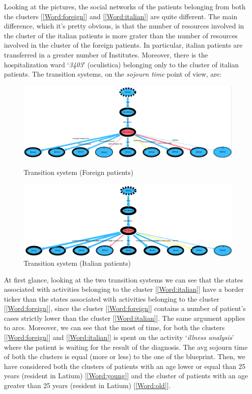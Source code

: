 \newline
\noindent
Looking at the pictures, the social networks of the patients belonging from both the clusters [\ref{Word:foreign}] and [\ref{Word:italian}] are quite different. The main difference, which it’s pretty obvious, is that the number of resources involved in the cluster of the italian patients is more grater than the number of resources involved in the cluster of the foreign patients. In particular, italian patients are transferred in a greater number of Institutes. Moreover, there is the hospitalization ward `\textit{3403}' (oculistica) belonging only to the cluster of italian patients. The transition systems, on the \textit{sojourn time} point of view, are:
\begin{figure} [h]
\includegraphics[width=\textwidth]{ProntoSoccorsoSojournForeigns}
\caption{Transition system (Foreign patients)}
\includegraphics[width=\textwidth]{ProntoSoccorsoSojournItalians}
\caption{Transition system (Italian patients)}
\end{figure} \newline
At first glance, looking at the two transition systems we can see that the states associated with activities belonging to the cluster [\ref{Word:italian}] have a border ticker than the states associated with activities belonging to the cluster [\ref{Word:foreign}], since the cluster [\ref{Word:foreign}] contains a number of patient's cases strictly lower than the cluster [\ref{Word:italian}]. The same argument applies to arcs. Moreover, we can see that the most of time, for both the clusters [\ref{Word:foreign}] and [\ref{Word:italian}] is spent on the activity `\textit{illness analysis}' where the patient is waiting for the result of the diagnosis. The avg sojourn time of both the clusters is equal (more or less) to the one of the blueprint. Then, we have considered both the clusters of patients with an age lower or equal than 25 years (resident in Latium) [\ref{Word:young}] and the cluster of patients with an age greater than 25 years (resident in Latium) [\ref{Word:old}]. 
